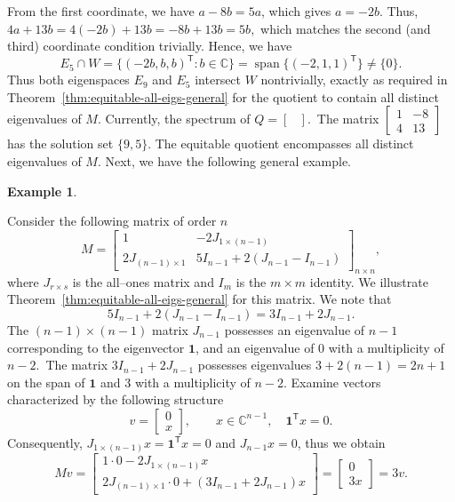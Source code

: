 \documentclass[12pt,twoside]{article}
\newtheorem{example}[theorem]{Example}
\begin{document}
	From the first coordinate, we have $a-8b = 5a $, which gives $a=-2b.$	Thus,  $4a+13b = 4(-2b)+13b = -8b+13b = 5b,$ which matches the second (and third) coordinate condition trivially. Hence, we have
	$$
	E_5\cap W = \{(-2b,b,b)^{\mathsf T} : b\in\mathbb{C}\}
	= \operatorname{span}\{(-2,1,1)^{\mathsf T}\}\neq\{0\}.
	$$ 
	Thus both eigenspaces $E_9$ and $E_5$ intersect $W$ nontrivially, exactly as required in
	Theorem~\ref{thm:equitable-all-eigs-general} for the quotient to contain all
	distinct eigenvalues of $M$. Currently, the spectrum of \( Q = \begin{bmatrix} \end{bmatrix}. \) The matrix $\begin{bmatrix} 1 & -8 \\ 4 & 13 \end{bmatrix}$ has the solution set $\{9, 5\}$. The equitable quotient encompasses all distinct eigenvalues of $M$.
	Next, we have the following general example.
\begin{example}\label{ex:block-matrix-equitable}\end{example}
	Consider the following matrix of order $n$
	$$
	M=\begin{bmatrix}
		1 & -2J_{1\times (n-1)}\\
		2 J_{(n-1)\times 1} & 5I_{n-1}+2(J_{n-1}-I_{n-1})
	\end{bmatrix}_{n\times n},
	$$
	where $J_{r\times s}$ is the all--ones matrix and $I_{m}$ is the $m\times m$
	identity. We illustrate Theorem~\ref{thm:equitable-all-eigs-general} for this
	matrix. We note that
	$$
	5I_{n-1}+2(J_{n-1}-I_{n-1})
	=
	3I_{n-1}+2J_{n-1}.
	$$
	The $(n-1)\times(n-1)$ matrix $J_{n-1}$ possesses an eigenvalue of $n-1$ corresponding to the eigenvector $\mathbf{1}$, and an eigenvalue of $0$ with a multiplicity of $n-2$. The matrix $3I_{n-1}+2J_{n-1}$ possesses eigenvalues $3+2(n-1)=2n+1$ on the span of $\mathbf{1}$ and $3$ with a multiplicity of $n-2$.
	Examine vectors characterized by the following structure
	$$
	v=\begin{bmatrix}0\\ x\end{bmatrix},\qquad x\in\mathbb{C}^{n-1},\quad \mathbf{1}^\mathsf{T}x=0.
	$$
	Consequently, $J_{1\times(n-1)}x=\mathbf{1}^\mathsf{T}x=0$ and $J_{n-1}x=0$, thus we obtain
	$$
	Mv
	=
	\begin{bmatrix}
		1\cdot 0 -2J_{1\times(n-1)}x\\
		2J_{(n-1)\times1}\cdot 0 + (3I_{n-1}+2J_{n-1})x
	\end{bmatrix}
	=
	\begin{bmatrix}0\\ 3x\end{bmatrix}
	=3v.
	$$
\end{document}
